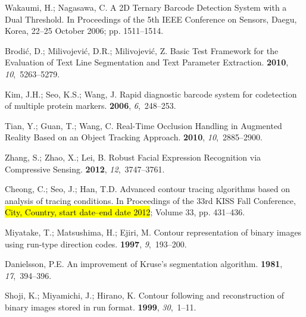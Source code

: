 \documentclass[sensors,article,accept,moreauthors,pdftex,10pt,a4paper]{mdpi}
\begin{document}
\begin{thebibliography}{999}
Wakaumi, H.; Nagasawa, C.
\newblock A 2D Ternary Barcode Detection System with a Dual Threshold.
\newblock In Proceedings of the 5th IEEE Conference on Sensors, Daegu, Korea, 22--25 October 2006; pp. 1511--1514.

Brodić, D.; Milivojević, D.R.; Milivojević, Z.
\newblock Basic Test Framework for the Evaluation of Text Line Segmentation and
 Text Parameter Extraction.
 {\bf 2010}, {\em 10},~5263--5279.

Kim, J.H.; Seo, K.S.; Wang, J.
\newblock Rapid diagnostic barcode system for codetection of multiple protein
 markers.
 {\bf 2006}, {\em 6},~248--253.

Tian, Y.; Guan, T.; Wang, C.
\newblock Real-Time Occlusion Handling in Augmented Reality Based on an Object
 Tracking Approach.
 {\bf 2010}, {\em 10},~2885--2900.

Zhang, S.; Zhao, X.; Lei, B.
\newblock Robust Facial Expression Recognition via Compressive Sensing.
 {\bf 2012}, {\em 12},~3747--3761.

Cheong, C.; Seo, J.; Han, T.D.
\newblock Advanced contour tracing algorithms based on analysis of tracing
 conditions.
\newblock In Proceedings of the 33rd KISS Fall Conference, \hl{ City, Country, start date--end date 2012}; Volume 
 33, pp. 431--436.

Miyatake, T.; Matsushima, H.; Ejiri, M.
\newblock Contour representation of binary images using run-type direction
 codes.
 {\bf 1997}, {\em 9},~193--200.

Danielsson, P.E.
\newblock An improvement of Kruse's segmentation algorithm.
 {\bf 1981}, {\em
 17},~394--396.

Shoji, K.; Miyamichi, J.; Hirano, K.
\newblock Contour following and reconstruction of binary images stored in run
 format.
 {\bf 1999}, {\em 30},~1--11.


\end{thebibliography}
\end{document}
